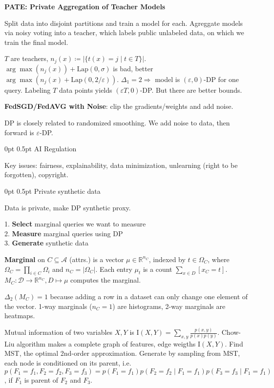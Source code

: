 \documentclass[11pt,landscape,a4paper,fleqn]{article}
\makeatletter
\renewcommand{\section}{\@startsection{section}{1}{0mm}%
                                {0pt}%
                                {0.5pt}%
                                {\color{myorange}\sffamily\small\bfseries}}
\makeatother
\begin{document}
\begin{multicols*}{4}
\textbf{PATE: Private Aggregation of Teacher Models}

Split data into disjoint partitions and train a model for each.
Agreggate models via noisy voting into a teacher, which labels public unlabeled data,
on which we train the final model.

\(T\) are teachers, \(n_j(x) \coloneqq |\{t(x) = j \mid t \in T\}|\).\\
\(\arg\max(n_j(x)) + \mathrm{Lap}(0, \sigma)\) is bad, better
\(\arg\max(n_j(x) + \mathrm{Lap}(0, 2 / \varepsilon))\).
\(\Delta_1 = 2 \Rightarrow\) model is \((\varepsilon, 0)\)-DP for one query.
Labeling \(T\) data points yields \((\varepsilon T, 0)\)-DP.
But there are better bounds.

\textbf{FedSGD/FedAVG with Noise}: clip the gradients/weights and add noise.

DP is closely related to randomized smoothing. We add noise to data, then forward is \(\varepsilon\)-DP.

\section{AI Regulation}

Key issues: fairness, explainability, data minimization, unlearning (right to be forgotten), copyright.

\section{Private synthetic data}

Data is private, make DP synthetic proxy.

1. \textbf{Select} marginal queries we want to measure\\
2. \textbf{Measure} marginal queries using DP\\
3. \textbf{Generate} synthetic data

\textbf{Marginal} on \(C \subseteq \mathcal{A}\) (attrs.) is a vector \(\mu \in \mathbb{R}^{n_C}\),
indexed by \(t \in \Omega_C\), where \(\Omega_C = \prod_{i \in C} \Omega_i\) and \(n_C = |\Omega_C|\).
Each entry \(\mu_t\) is a count \(\sum_{x \in D} [x_C = t]\).
\(M_C : \mathcal{D} \to \mathbb{R}^{n_C}, D \mapsto \mu\) computes the marginal.

\(\Delta_2(M_C) = 1\) because adding a row in a dataset can only
change one element of the vector.
1-way marginals (\(n_C = 1\)) are histograms, 2-way marginals are heatmaps.

Mutual information of two variables \(X, Y\) is \(\mathrm{I}(X, Y) = \sum_{x, y} \frac{p(x, y)}{p(x) p(y)}\).
Chow-Liu algorithm makes a complete graph of features, edge weigths \(\mathrm{I}(X, Y)\).
Find MST, the optimal 2nd-order approximation.
Generate by sampling from MST, each node is conditioned on its parent, i.e.
\(p(F_1 = f_1, F_2 = f_2, F_3 = f_3) = p(F_1 = f_1) p(F_2 = f_2 \mid F_1 = f_1) p(F_3 = f_3 \mid F_1 = f_1)\),
if \(F_1\) is parent of \(F_2\) and \(F_3\).


\end{multicols*}
\end{document}
